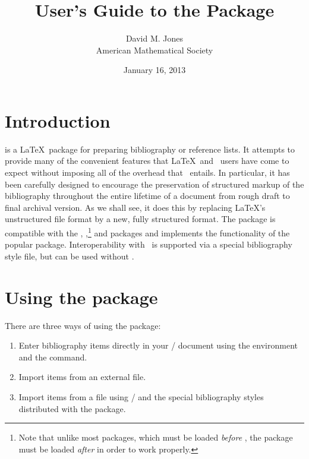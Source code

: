 \documentclass[oneside]{amsdtx}
\title{User's Guide to the \pkg{amsrefs} Package}
\author{David M. Jones\\American Mathematical Society}
\date{January 16, 2013}
\theoremstyle{note}
\newcommand{\rpack}[1]{\pkg{amsrefs} package}
\begin{document}
\maketitle

\tableofcontents

\section{Introduction}

 is a \LaTeX\ package for preparing bibliography or
reference lists.  It attempts to provide many of the convenient
features that \LaTeX\ and \BibTeX\ users have come to expect without
imposing all of the overhead that \BibTeX\ entails.  In particular, it
has been carefully designed to encourage the preservation of
structured markup of the bibliography throughout the entire lifetime
of a document from rough draft to final archival version.  As we shall
see, it does this by replacing \LaTeX's unstructured  file
format by a new, fully structured format.  The package is compatible
with the , ,\footnote{Note that unlike
  most packages, which must be loaded \emph{before} ,
  the  package must be loaded \emph{after} 
  in order to work properly.} and  packages and
implements the functionality of the popular  package.
Interoperability with \BibTeX\ is supported via a special bibliography
style file, but  can be used without \BibTeX.

\section{Using the  package}

There are three ways of using the \rpack/:
\begin{enumerate}

\item
Enter bibliography items directly in your \latex/ document using the
 environment and the  command.

\item
Import items from an external  file.

\item
Import items from a  file using \bibtex/ and the special
bibliography styles distributed with the  package.

\end{enumerate}
\end{document}

